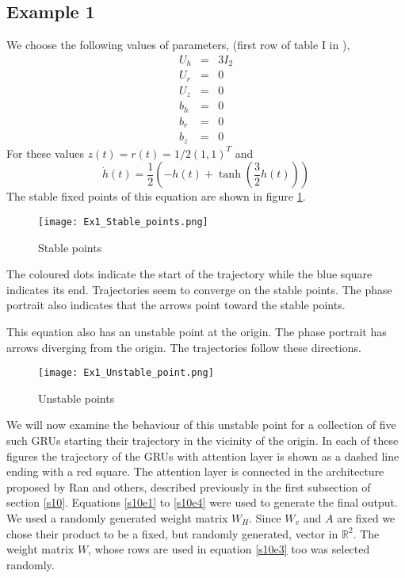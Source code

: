 \documentclass{article}
\numberwithin{equation}{section}
\begin{document}
\subsection{Example 1}
We choose the following values of parameters, (first row of table I in 
\cite{jordan2019gated}),
\begin{eqnarray}
U_h &=& 3I_2 \label{s11e12} \\
U_r &=& 0 \label{s11e13} \\
U_z &=& 0 \label{s11e14} \\
b_h &=& 0 \label{s11e15} \\
b_r &=& 0 \label{s11e16} \\
b_z &=& 0 \label{s11e17} 
\end{eqnarray}
For these values $z(t) = r(t) = 1/2(1, 1)^T$ and
\begin{equation}\label{s11e18}
\dot{h}(t) = \frac{1}{2}\left(-h(t) + \tanh\left(\frac{3}{2}h(t)\right)\right)
\end{equation}
The stable fixed points of this equation are shown in figure \ref{f1}.
\begin{figure}[!htbp]
\caption{Stable points}\label{f1}
\texttt{[image: Ex1\_Stable\_points.png]}
\centering
\end{figure}
The coloured dots indicate the start of the trajectory while the blue square
indicates its end. Trajectories seem to converge on the stable points. The
phase portrait also indicates that the arrows point toward the stable points.

This equation also has an unstable point at the origin. The phase portrait 
has arrows diverging from the origin. The trajectories follow these 
directions.
\begin{figure}[!htbp]
\caption{Unstable points}\label{f2}
\texttt{[image: Ex1\_Unstable\_point.png]}
\centering
\end{figure}
We will now examine the behaviour of this unstable point for a collection of
five such GRUs starting their trajectory in the vicinity of the origin.
In each of these figures the trajectory of the GRUs with attention layer
is shown as a dashed line ending with a red square. The attention layer is 
connected in the architecture proposed by Ran and others, described previously
in the first subsection of section \ref{s10}. Equations \eqref{s10e1} to 
\eqref{s10e4} were used to generate the final output. We used a randomly 
generated weight matrix $W_H$. Since $W_v$ and $A$ are fixed we chose their
product to be a fixed, but randomly generated, vector in $\mathbb{R}^2$. The
weight matrix $W$, whose rows are used in equation \eqref{s10e3} too was 
selected randomly. 
\end{document}
